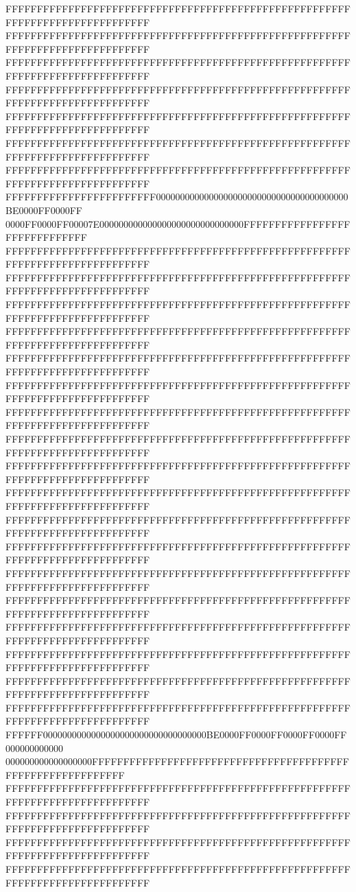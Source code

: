 FFFFFFFFFFFFFFFFFFFFFFFFFFFFFFFFFFFFFFFFFFFFFFFFFFFFFFFFFFFFFFFFFFFFFFFFFFFFFF
FFFFFFFFFFFFFFFFFFFFFFFFFFFFFFFFFFFFFFFFFFFFFFFFFFFFFFFFFFFFFFFFFFFFFFFFFFFFFF
FFFFFFFFFFFFFFFFFFFFFFFFFFFFFFFFFFFFFFFFFFFFFFFFFFFFFFFFFFFFFFFFFFFFFFFFFFFFFF
FFFFFFFFFFFFFFFFFFFFFFFFFFFFFFFFFFFFFFFFFFFFFFFFFFFFFFFFFFFFFFFFFFFFFFFFFFFFFF
FFFFFFFFFFFFFFFFFFFFFFFFFFFFFFFFFFFFFFFFFFFFFFFFFFFFFFFFFFFFFFFFFFFFFFFFFFFFFF
FFFFFFFFFFFFFFFFFFFFFFFFFFFFFFFFFFFFFFFFFFFFFFFFFFFFFFFFFFFFFFFFFFFFFFFFFFFFFF
FFFFFFFFFFFFFFFFFFFFFFFFFFFFFFFFFFFFFFFFFFFFFFFFFFFFFFFFFFFFFFFFFFFFFFFFFFFFFF
FFFFFFFFFFFFFFFFFFFFFFFF0000000000000000000000000000000000000000BE0000FF0000FF
0000FF0000FF00007E000000000000000000000000000000FFFFFFFFFFFFFFFFFFFFFFFFFFFFFF
FFFFFFFFFFFFFFFFFFFFFFFFFFFFFFFFFFFFFFFFFFFFFFFFFFFFFFFFFFFFFFFFFFFFFFFFFFFFFF
FFFFFFFFFFFFFFFFFFFFFFFFFFFFFFFFFFFFFFFFFFFFFFFFFFFFFFFFFFFFFFFFFFFFFFFFFFFFFF
FFFFFFFFFFFFFFFFFFFFFFFFFFFFFFFFFFFFFFFFFFFFFFFFFFFFFFFFFFFFFFFFFFFFFFFFFFFFFF
FFFFFFFFFFFFFFFFFFFFFFFFFFFFFFFFFFFFFFFFFFFFFFFFFFFFFFFFFFFFFFFFFFFFFFFFFFFFFF
FFFFFFFFFFFFFFFFFFFFFFFFFFFFFFFFFFFFFFFFFFFFFFFFFFFFFFFFFFFFFFFFFFFFFFFFFFFFFF
FFFFFFFFFFFFFFFFFFFFFFFFFFFFFFFFFFFFFFFFFFFFFFFFFFFFFFFFFFFFFFFFFFFFFFFFFFFFFF
FFFFFFFFFFFFFFFFFFFFFFFFFFFFFFFFFFFFFFFFFFFFFFFFFFFFFFFFFFFFFFFFFFFFFFFFFFFFFF
FFFFFFFFFFFFFFFFFFFFFFFFFFFFFFFFFFFFFFFFFFFFFFFFFFFFFFFFFFFFFFFFFFFFFFFFFFFFFF
FFFFFFFFFFFFFFFFFFFFFFFFFFFFFFFFFFFFFFFFFFFFFFFFFFFFFFFFFFFFFFFFFFFFFFFFFFFFFF
FFFFFFFFFFFFFFFFFFFFFFFFFFFFFFFFFFFFFFFFFFFFFFFFFFFFFFFFFFFFFFFFFFFFFFFFFFFFFF
FFFFFFFFFFFFFFFFFFFFFFFFFFFFFFFFFFFFFFFFFFFFFFFFFFFFFFFFFFFFFFFFFFFFFFFFFFFFFF
FFFFFFFFFFFFFFFFFFFFFFFFFFFFFFFFFFFFFFFFFFFFFFFFFFFFFFFFFFFFFFFFFFFFFFFFFFFFFF
FFFFFFFFFFFFFFFFFFFFFFFFFFFFFFFFFFFFFFFFFFFFFFFFFFFFFFFFFFFFFFFFFFFFFFFFFFFFFF
FFFFFFFFFFFFFFFFFFFFFFFFFFFFFFFFFFFFFFFFFFFFFFFFFFFFFFFFFFFFFFFFFFFFFFFFFFFFFF
FFFFFFFFFFFFFFFFFFFFFFFFFFFFFFFFFFFFFFFFFFFFFFFFFFFFFFFFFFFFFFFFFFFFFFFFFFFFFF
FFFFFFFFFFFFFFFFFFFFFFFFFFFFFFFFFFFFFFFFFFFFFFFFFFFFFFFFFFFFFFFFFFFFFFFFFFFFFF
FFFFFFFFFFFFFFFFFFFFFFFFFFFFFFFFFFFFFFFFFFFFFFFFFFFFFFFFFFFFFFFFFFFFFFFFFFFFFF
FFFFFFFFFFFFFFFFFFFFFFFFFFFFFFFFFFFFFFFFFFFFFFFFFFFFFFFFFFFFFFFFFFFFFFFFFFFFFF
FFFFFF0000000000000000000000000000000000BE0000FF0000FF0000FF0000FF000000000000
000000000000000000FFFFFFFFFFFFFFFFFFFFFFFFFFFFFFFFFFFFFFFFFFFFFFFFFFFFFFFFFFFF
FFFFFFFFFFFFFFFFFFFFFFFFFFFFFFFFFFFFFFFFFFFFFFFFFFFFFFFFFFFFFFFFFFFFFFFFFFFFFF
FFFFFFFFFFFFFFFFFFFFFFFFFFFFFFFFFFFFFFFFFFFFFFFFFFFFFFFFFFFFFFFFFFFFFFFFFFFFFF
FFFFFFFFFFFFFFFFFFFFFFFFFFFFFFFFFFFFFFFFFFFFFFFFFFFFFFFFFFFFFFFFFFFFFFFFFFFFFF
FFFFFFFFFFFFFFFFFFFFFFFFFFFFFFFFFFFFFFFFFFFFFFFFFFFFFFFFFFFFFFFFFFFFFFFFFFFFFF
